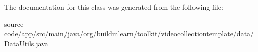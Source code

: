 The documentation for this class was generated from the following file\+:\begin{DoxyCompactItemize}
\item 
source-\/code/app/src/main/java/org/buildmlearn/toolkit/videocollectiontemplate/data/\hyperlink{videocollectiontemplate_2data_2DataUtils_8java}{Data\+Utils.\+java}\end{DoxyCompactItemize}
